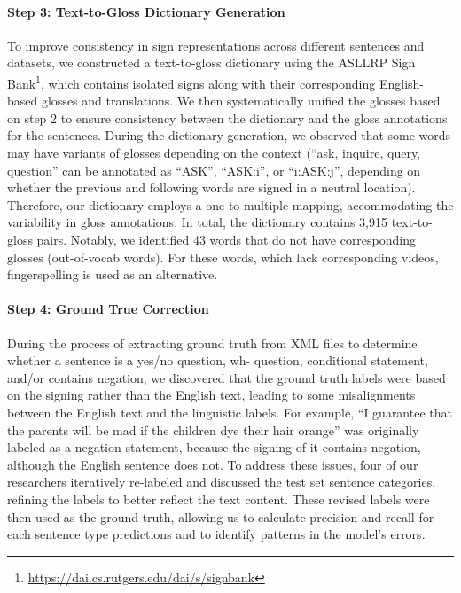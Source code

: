 \paragraph{Step 3: Text-to-Gloss Dictionary Generation} To improve consistency in sign representations across different sentences and datasets, we constructed a text-to-gloss dictionary using the ASLLRP Sign Bank\footnote{\url{https://dai.cs.rutgers.edu/dai/s/signbank}}, which contains isolated signs along with their corresponding English-based glosses and translations. We then systematically unified the glosses based on step 2 to ensure consistency between the dictionary and the gloss annotations for the sentences. During the dictionary generation, we observed that some words may have variants of glosses depending on the context (\eg ``ask, inquire, query, question'' can be annotated as ``ASK'', ``ASK:i'', or ``i:ASK:j'', depending on whether the previous and following words are signed in a neutral location). Therefore, our dictionary employs a one-to-multiple mapping, accommodating the variability in gloss annotations. In total, the dictionary contains 3,915 text-to-gloss pairs. Notably, we identified 43 words that do not have corresponding glosses (\ie out-of-vocab words). For these words, which lack corresponding videos, fingerspelling is used as an alternative. 

\paragraph{Step 4: Ground True Correction} During the process of extracting ground truth from XML files to determine whether a sentence is a yes/no question, wh- question, conditional statement, and/or contains negation, we discovered that the ground truth labels were based on the signing rather than the English text, leading to some misalignments between the English text and the linguistic labels. For example, ``I guarantee that the parents will be mad if the children dye their hair orange'' was originally labeled as a negation statement, because the signing of it contains negation, although the English sentence does not. To address these issues, four of our researchers iteratively re-labeled and discussed the test set sentence categories, refining the labels to better reflect the text content. These revised labels were then used as the ground truth, allowing us to calculate precision and recall for each sentence type predictions and to identify patterns in the model's errors.